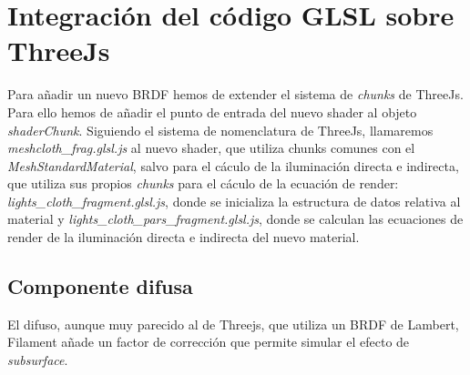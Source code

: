 


\vspace{1cm}
\section{Integraci\'on del c\'odigo GLSL sobre ThreeJs}
  Para a\~nadir un nuevo BRDF hemos de extender el sistema de \textit{chunks} de ThreeJs. Para ello hemos de a\~nadir el
  punto de entrada del nuevo shader al objeto \textit{shaderChunk}. Siguiendo el sistema de nomenclatura de ThreeJs,
  llamaremos \textit{meshcloth\_frag.glsl.js} al nuevo shader, que utiliza chunks comunes con el \textit{MeshStandardMaterial},
  salvo para el c\'aculo de la iluminaci\'on directa e indirecta, que utiliza sus propios \textit{chunks} para el c\'aculo
  de la ecuaci\'on de render: \textit{lights\_cloth\_fragment.glsl.js}, donde se inicializa la estructura de datos relativa
  al material y \textit{lights\_cloth\_pars\_fragment.glsl.js}, donde se calculan las ecuaciones de render de la iluminaci\'on
  directa e indirecta del nuevo material.

  \subsection{Componente difusa}

  El difuso, aunque muy parecido al de Threejs, que utiliza un BRDF de Lambert,
  Filament a\~nade un factor de correcci\'on que permite simular el efecto de \textit{subsurface}.

